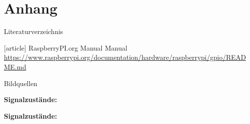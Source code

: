 \section{Anhang}
\begin{frame}{Literaturverzeichnis}
    \begin{thebibliography}{Längste Bezeichnung}
        [article]
           RaspberryPI.org Manual
            \newblock Manual \url{https://www.raspberrypi.org/documentation/hardware/raspberrypi/gpio/README.md}
    \end{thebibliography}
\end{frame}
{
    \tiny
    \begin{frame}{Bildquellen}
        \begin{minipage}{\textwidth}
            \textbf{Signalzustände:} \\
        \end{minipage}
        \smallskip
        
    	\begin{minipage}{\textwidth}
            \textbf{Signalzustände:} \\
        \end{minipage}
    \end{frame}
}
